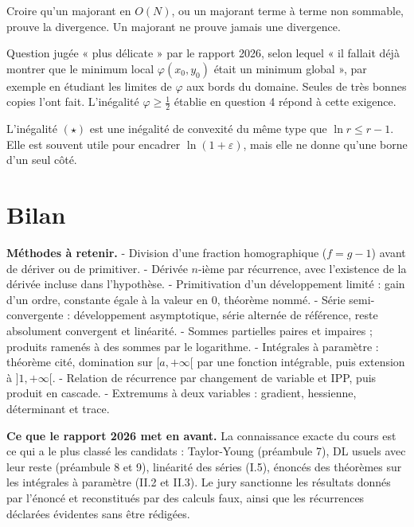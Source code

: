 \documentclass[11pt,a4paper]{article}
\begin{document}
\begin{piege}

Croire qu'un majorant en \(O(N)\), ou un majorant terme à terme non sommable, prouve la divergence. Un majorant ne prouve jamais une divergence.

\end{piege}

\begin{jury}

Question jugée « plus délicate » par le rapport 2026, selon lequel « il fallait déjà montrer que le minimum local \(\varphi(x_0, y_0)\) était un minimum global », par exemple en étudiant les limites de \(\varphi\) aux bords du domaine. Seules de très bonnes copies l'ont fait. L'inégalité \(\varphi\ge\frac12\) établie en question 4 répond à cette exigence.

\end{jury}

\begin{methode}

L'inégalité \((\star)\) est une inégalité de convexité du même type que \(\ln r\le r-1\). Elle est souvent utile pour encadrer \(\ln(1+\varepsilon)\), mais elle ne donne qu'une borne d'un seul côté.

\end{methode}

\hypertarget{bilan}{%
\section{Bilan}\label{bilan}}

\textbf{Méthodes à retenir.}
- Division d'une fraction homographique (\(f=g-1\)) avant de dériver ou de primitiver.
- Dérivée \(n\)-ième par récurrence, avec l'existence de la dérivée incluse dans l'hypothèse.
- Primitivation d'un développement limité : gain d'un ordre, constante égale à la valeur en \(0\), théorème nommé.
- Série semi-convergente : développement asymptotique, série alternée de référence, reste absolument convergent et linéarité.
- Sommes partielles paires et impaires ; produits ramenés à des sommes par le logarithme.
- Intégrales à paramètre : théorème cité, domination sur \([a,+\infty[\) par une fonction intégrable, puis extension à \(]1,+\infty[\).
- Relation de récurrence par changement de variable et IPP, puis produit en cascade.
- Extremums à deux variables : gradient, hessienne, déterminant et trace.

\textbf{Ce que le rapport 2026 met en avant.} La connaissance exacte du cours est ce qui a le plus classé les candidats : Taylor-Young (préambule 7), DL usuels avec leur reste (préambule 8 et 9), linéarité des séries (I.5), énoncés des théorèmes sur les intégrales à paramètre (II.2 et II.3). Le jury sanctionne les résultats donnés par l'énoncé et reconstitués par des calculs faux, ainsi que les récurrences déclarées évidentes sans être rédigées.
\end{document}
